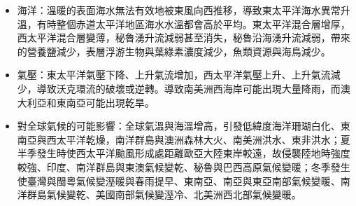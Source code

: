 \documentclass[a4paper,12pt]{report}
\begin{document}
\begin{itemize}
\begin{itemize}
  \item 海洋：溫暖的表面海水無法有效地被東風向西推移，導致東太平洋海水異常升溫，有時整個赤道太平洋地區海水水溫都會高於平均。東太平洋混合層增厚，西太平洋混合層變薄，秘魯湧升流減弱甚至消失，秘魯沿海湧升流減弱，帶來的營養鹽減少，表層浮游生物與葉綠素濃度減少，魚類資源與海鳥減少。
  \item 氣壓：東太平洋氣壓下降、上升氣流增加，西太平洋氣壓上升、上升氣流減少，導致沃克環流的破壞或逆轉。導致南美洲西海岸可能出現大量降雨，而澳大利亞和東南亞可能出現乾旱。
  \item 對全球氣候的可能影響：全球氣溫與海溫增高，引發低緯度海洋珊瑚白化、東南亞與西太平洋乾燥，南洋群島與澳洲森林大火、南美洲洪水、東非洪水；夏半季發生時使西太平洋颱風形成處距離歐亞大陸東岸較遠，故侵襲陸地時強度較強、印度、南洋群島與東澳氣候變乾、秘魯與巴西高原氣候變暖；冬季發生使臺灣與閩粵氣候變溼暖與春雨提早、東南亞、南亞與東亞南部氣候變暖、南洋群島氣候變乾、美國南部氣候變溼冷、北美洲西北部氣候變暖。
\end{itemize}

\end{itemize}
\end{document}
